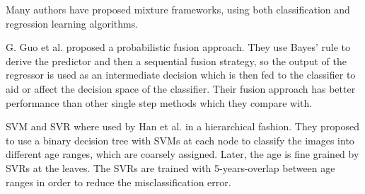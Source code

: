Many authors have proposed mixture frameworks, using both classification and regression learning algorithms. 

G. Guo et al. \cite{4563041} proposed a probabilistic fusion approach. They use Bayes' rule to derive the predictor and then a sequential fusion strategy, so the output of the regressor is used as an intermediate decision which is then fed to the classifier to aid or affect the decision space of the classifier. Their fusion approach has better performance than other single step methods which they compare with.

SVM and SVR where used by Han et al. \cite{han:age} in a hierarchical fashion. They proposed to use a binary decision tree with SVMs at each node to classify the images into different age ranges, which are coarsely assigned. Later, the age is fine grained by SVRs at the leaves. The SVRs are trained with 5-years-overlap between age ranges in order to reduce the misclassification error.


